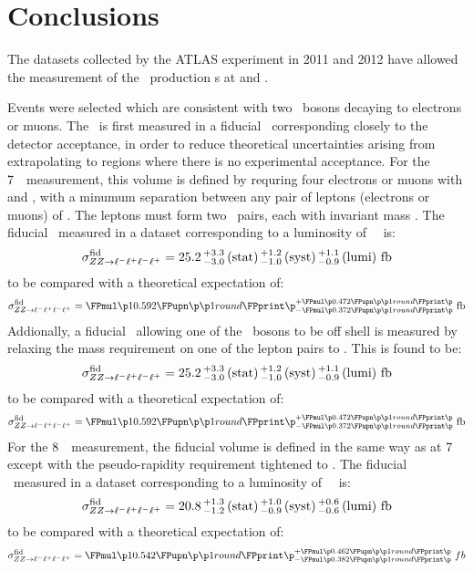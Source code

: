 \graphicspath{{Chapters/Conclusions/Figures/}}
\chapter{Conclusions}
\label{chap:Conclusions}
The datasets collected by the ATLAS experiment in 2011 and 2012 have allowed the
measurement of the \ZZ\ production \cx s at  and .

Events were selected which are consistent with two \Z\ bosons decaying to electrons or muons. The \cx\ is
first measured in a fiducial \phasespace\ corresponding closely to the detector
acceptance, in order to reduce theoretical uncertainties arising from
extrapolating to regions where there is no experimental acceptance.
For the 7~\tev\ measurement, this volume is defined by requring four
electrons or muons with  and , with a minumum separation
between any pair of leptons (electrons or muons) of . The leptons
must form two \ossf\ pairs, each with invariant mass \sstooos. 
The fiducial \cx\
measured in a dataset corresponding to a luminosity of
\LumiPassGRLTwentyEleven~\ifb\ is:
\begin{equation}
{\sigma_{\ensuremath{{ZZ\rightarrow\ell^{-}\ell^{+}\ell^{-}\ell^{+}}}}^{\rm fid}} = 25.2\, ^{+3.3}_{-3.0}\, \rm{(stat)}\, ^{+1.2}_{-1.0}\, \rm{(syst)}\, ^{+1.1}_{-0.9}\, \rm{(lumi)}~{\rm fb}
\end{equation}
to be compared with a theoretical expectation of:
\begin{equation}
\sigmaFidZZllll = \ZZSevenTeVTheoryFiducialCrossSectionZZLLLL
\end{equation}
Addionally, a fiducial \cx\ allowing one of the \Z\ bosons to be off shell is
measured by relaxing the mass requirement on one of the lepton pairs
to \mllgtt. This is found to be:
\begin{equation}
{\sigma_{\ensuremath{{ZZ\rightarrow\ell^{-}\ell^{+}\ell^{-}\ell^{+}}}}^{\rm fid}} = 25.2\, ^{+3.3}_{-3.0}\, \rm{(stat)}\, ^{+1.2}_{-1.0}\, \rm{(syst)}\, ^{+1.1}_{-0.9}\, \rm{(lumi)}~{\rm fb}
\end{equation}
to be compared with a theoretical expectation of:
\begin{equation}
\sigmaFidZZllll = \ZZSevenTeVTheoryFiducialCrossSectionZZLLLL
\end{equation}
For the 8~\tev\ measurement, the fiducial volume is defined in the same way as
at 7~\tev\, except with the pseudo-rapidity requirement tightened to . The fiducial \cx\
measured in a dataset corresponding to a luminosity of
\LumiPassGRLTwentyTwelve~\ifb\ is:
\begin{equation}
{\sigma_{\ensuremath{{ZZ\rightarrow\ell^{-}\ell^{+}\ell^{-}\ell^{+}}}}^{\rm fid}} = 20.8\, ^{+1.3}_{-1.2}\, \rm{(stat)}\, ^{+1.0}_{-0.9}\, \rm{(syst)}\, ^{+0.6}_{-0.6}\, \rm{(lumi)}~fb
\end{equation}
to be compared with a theoretical expectation of:
\begin{equation}
\sigmaFidZZllll = \ZZEightTeVTheoryFiducialCrossSectionZZLLLL
\end{equation}

